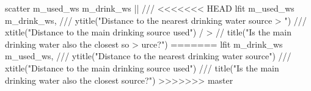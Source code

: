 scatter m_used_ws m_drink_ws  || ///
<<<<<<< HEAD
lfit m_used_ws m_drink_ws, ///
        ytitle("Distance to the nearest drinking water source
> ") ///
        xtitle("Distance to the main drinking source used") /
> //
        title("Is the main drinking water also the closest so
> urce?")
=======
lfit m_drink_ws m_used_ws, ///
        ytitle("Distance to the nearest drinking water source") ///
        xtitle("Distance to the main drinking source used") ///
        title("Is the main drinking water also the closest source?")
>>>>>>> master
